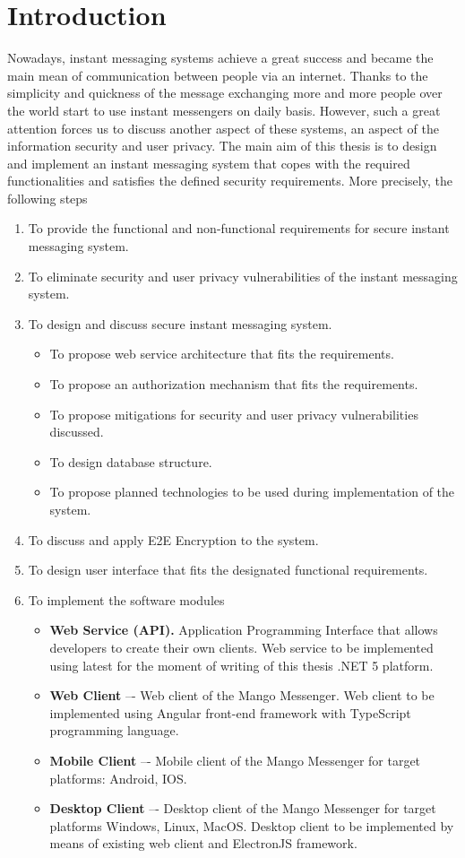 \chapter{Introduction}\label{ch:introduction}
Nowadays, instant messaging systems achieve a great success and became the main mean of communication
between people via an internet.
Thanks to the simplicity and quickness of the message exchanging more and more people over the world start to use
instant messengers on daily basis.
However, such a great attention forces us to discuss another aspect of these systems, an aspect of the
information security and user privacy.
The main aim of this thesis is to design and implement an instant messaging system
that copes with the required functionalities and satisfies the defined security requirements.
More precisely, the following steps
\begin{enumerate}
    \item To provide the functional and non-functional requirements for secure instant messaging system.
    \item To eliminate security and user privacy vulnerabilities of the instant messaging system.
    \item To design and discuss secure instant messaging system.
    \begin{itemize}
        \item To propose web service architecture that fits the requirements.
        \item To propose an authorization mechanism that fits the requirements.
        \item To propose mitigations for security and user privacy vulnerabilities discussed.
        \item To design database structure.
        \item To propose planned technologies to be used during implementation of the system.
    \end{itemize}
    \item To discuss and apply E2E Encryption to the system.
    \item To design user interface that fits the designated functional requirements.
    \item To implement the software modules
    \begin{itemize}
        \item \textbf{Web Service (API).} Application Programming Interface that allows developers to create their own clients.
        Web service to be implemented using latest for the moment of writing of this thesis .NET 5 platform.
        \item \textbf{Web Client} –- Web client of the Mango Messenger.
        Web client to be implemented using Angular front-end framework with TypeScript programming language.
        \item \textbf{Mobile Client} –- Mobile client of the Mango Messenger for target platforms: Android, IOS\@.
        \item \textbf{Desktop Client} –- Desktop client of the Mango Messenger for target platforms Windows, Linux, MacOS\@.
        Desktop client to be implemented by means of existing web client and ElectronJS framework.
    \end{itemize}
\end{enumerate}